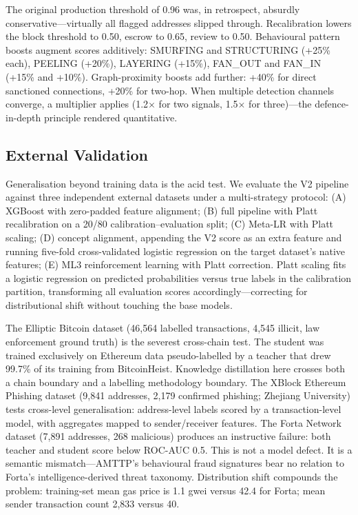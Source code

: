 \documentclass[journal]{IEEEtran}
\begin{document}
The original production threshold of 0.96 was, in retrospect, absurdly conservative---virtually all flagged addresses slipped through. Recalibration lowers the block threshold to 0.50, escrow to 0.65, review to 0.50. Behavioural pattern boosts augment scores additively: SMURFING and STRUCTURING (+25\% each), PEELING (+20\%), LAYERING (+15\%), FAN\_OUT and FAN\_IN (+15\% and +10\%). Graph-proximity boosts add further: +40\% for direct sanctioned connections, +20\% for two-hop. When multiple detection channels converge, a multiplier applies (1.2$\times$ for two signals, 1.5$\times$ for three)---the defence-in-depth principle rendered quantitative.

\subsection{External Validation}

Generalisation beyond training data is the acid test. We evaluate the V2 pipeline against three independent external datasets under a multi-strategy protocol: (A) XGBoost with zero-padded feature alignment; (B) full pipeline with Platt recalibration on a 20/80 calibration--evaluation split; (C) Meta-LR with Platt scaling; (D) concept alignment, appending the V2 score as an extra feature and running five-fold cross-validated logistic regression on the target dataset's native features; (E) ML3 reinforcement learning with Platt correction. Platt scaling fits a logistic regression on predicted probabilities versus true labels in the calibration partition, transforming all evaluation scores accordingly---correcting for distributional shift without touching the base models.

The Elliptic Bitcoin dataset (46,564 labelled transactions, 4,545 illicit, law enforcement ground truth) is the severest cross-chain test. The student was trained exclusively on Ethereum data pseudo-labelled by a teacher that drew 99.7\% of its training from BitcoinHeist. Knowledge distillation here crosses both a chain boundary and a labelling methodology boundary. The XBlock Ethereum Phishing dataset (9,841 addresses, 2,179 confirmed phishing; Zhejiang University) tests cross-level generalisation: address-level labels scored by a transaction-level model, with aggregates mapped to sender/receiver features. The Forta Network dataset (7,891 addresses, 268 malicious) produces an instructive failure: both teacher and student score below ROC-AUC 0.5. This is not a model defect. It is a semantic mismatch---AMTTP's behavioural fraud signatures bear no relation to Forta's intelligence-derived threat taxonomy. Distribution shift compounds the problem: training-set mean gas price is 1.1 gwei versus 42.4 for Forta; mean sender transaction count 2,833 versus 40.
\end{document}
